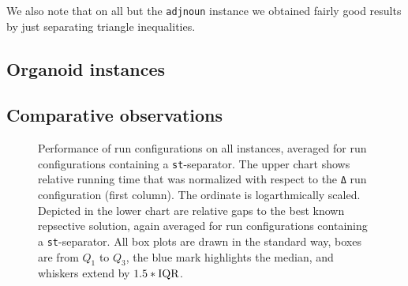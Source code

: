 We also note that on all but the \texttt{adjnoun} instance we obtained fairly good results by just separating triangle inequalities.

\subsection{Organoid instances}



\subsection{Comparative observations}\label{subsec:comparative_observations}

\begin{figure}
	\centering
	\resizebox{0.95\linewidth}{!}{
	}
	\bigskip
	\caption[Performance of run configurations]{Performance of run configurations on all instances, averaged for run configurations containing a \texttt{st}-separator.
		The upper chart shows relative running time that was normalized with respect to the \texttt{Δ} run configuration (first column).
		The ordinate is logarthmically scaled.
		Depicted in the lower chart are relative gaps to the best known repsective solution, again averaged for run configurations containing a \texttt{st}-separator.
		All box plots are drawn in the standard way, \ie boxes are from $Q_{1}$ to $Q_{3}$, the blue mark highlights the median, and whiskers extend by $1.5*\mathit{\text{IQR}}$.}
	\label{fig:time_and_gap_bars}
\end{figure}

